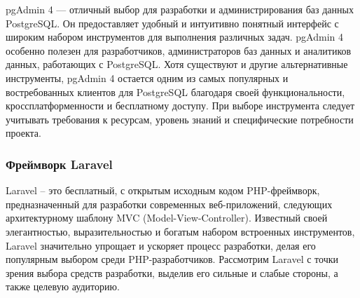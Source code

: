 pgAdmin 4 — отличный выбор для разработки и администрирования баз данных PostgreSQL. Он предоставляет удобный и интуитивно понятный интерфейс с широким набором инструментов для выполнения различных задач. pgAdmin 4 особенно полезен для разработчиков, администраторов баз данных и аналитиков данных, работающих с PostgreSQL. Хотя существуют и другие альтернативные инструменты, pgAdmin 4 остается одним из самых популярных и востребованных клиентов для PostgreSQL благодаря своей функциональности, кроссплатформенности и бесплатному доступу. При выборе инструмента следует учитывать требования к ресурсам, уровень знаний и специфические потребности проекта.


\subsubsection{Фреймворк Laravel}

Laravel – это бесплатный, с открытым исходным кодом PHP-фреймворк, предназначенный для разработки современных веб-приложений, следующих архитектурному шаблону MVC (Model-View-Controller). Известный своей элегантностью, выразительностью и богатым набором встроенных инструментов, Laravel значительно упрощает и ускоряет процесс разработки, делая его популярным выбором среди PHP-разработчиков. Рассмотрим Laravel с точки зрения выбора средств разработки, выделив его сильные и слабые стороны, а также целевую аудиторию.

